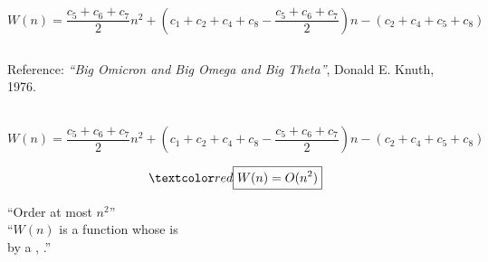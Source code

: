 
\begin{frame}{}
  \begin{center}
      \\[15pt] 

    \pause
    \vspace{-0.50cm}
    \vspace{-1.50cm}

    \pause
    \[
        W(n) = \frac{c_5 + c_6 + c_7}{2} n^2 
            + (c_1 + c_2 + c_4 + c_8 - \frac{c_5 + c_6 + c_7}{2}) n
            - (c_2 + c_4 + c_5 + c_8)
    \]
  \end{center}
\end{frame}

\begin{frame}{}
  \begin{columns}
  \end{columns}

  \vspace{0.50cm}
  \begin{alertblock}{Reference:}
    {\it ``Big Omicron and Big Omega and Big Theta''}, Donald E. Knuth, 1976.
  \end{alertblock}

  \pause
  \begin{center}
  \end{center}
\end{frame}

\begin{frame}{}
  \begin{center}
      \\[15pt] 

    \[
        W(n) = \frac{c_5 + c_6 + c_7}{2} n^2 
            + (c_1 + c_2 + c_4 + c_8 - \frac{c_5 + c_6 + c_7}{2}) n
            - (c_2 + c_4 + c_5 + c_8)
    \]

    \pause
    \[
      \red{\boxed{W(n) = O(n^2)}}
    \]

    \pause
    ``Order at most $n^2$''  \\[15pt]

    \pause
    ``$W(n)$ is a function whose  is  \\
    by a , .''
  \end{center}
\end{frame}

